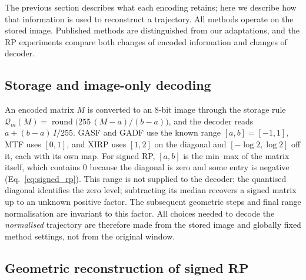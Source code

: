 \documentclass[preprint,review,12pt]{elsarticle}
\begin{document}
The previous section describes what each encoding retains; here we describe how that information is used to reconstruct a trajectory. All methods operate on the stored image. Published methods are distinguished from our adaptations, and the RP experiments compare both changes of encoded information and changes of decoder.

\subsection{Storage and image-only decoding}\label{sec:storage}

An encoded matrix $M$ is converted to an 8-bit image through the storage rule $\mathcal Q_m(M)=\operatorname{round}\bigl(255\,(M-a)/(b-a)\bigr)$, and the decoder reads $a+(b-a)\,I/255$. GASF and GADF use the known range $[a,b]=[-1,1]$, MTF uses $[0,1]$, and XIRP uses $[1,2]$ on the diagonal and $[-\log2,\log2]$ off it, each with its own map. For signed RP, $[a,b]$ is the min--max of the matrix itself, which contains $0$ because the diagonal is zero and some entry is negative (Eq.~\eqref{eq:signed_rp}). This range is not supplied to the decoder; the quantised diagonal identifies the zero level; subtracting its median recovers a signed matrix up to an unknown positive factor. The subsequent geometric steps and final range normalisation are invariant to this factor. All choices needed to decode the \emph{normalised} trajectory are therefore made from the stored image and globally fixed method settings, not from the original window.

\subsection{Geometric reconstruction of signed RP}\label{sec:rp_decoder}
\end{document}
